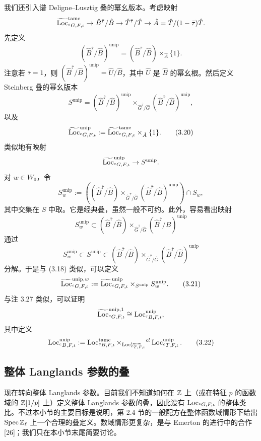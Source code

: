 我们还引入谱 Deligne–Lusztig 叠的幂幺版本。考虑映射
\[
\widetilde{\operatorname{Loc}}^{\mathrm{tame}}_{{}^{c}G,F,\iota}\to\hat B^{\bar\tau}/\hat B\to\hat T^{\bar\tau}/\hat T\to\hat A=\hat T/(1-\bar\tau)\hat T.
\]
先定义
\[
(\hat B^{\bar\tau}/\hat B)^{\mathrm{unip}}=(\hat B^{\bar\tau}/\hat B)\times_{\hat A}\{1\}.
\]
注意若 $\bar\tau=1$，则 $(\hat B^{\bar\tau}/\hat B)^{\mathrm{unip}}=\hat U/\hat B$，其中 $\hat U$ 是 $\hat B$ 的幂幺根。然后定义 Steinberg 叠的幂幺版本
\begin{equation}
S^{\mathrm{unip}}=(\hat B^{\bar\tau}/\hat B)^{\mathrm{unip}}\times_{\hat G^{\bar\tau}/\hat G}(\hat B^{\bar\tau}/\hat B)^{\mathrm{unip}}, \tag{3.19}
\end{equation}
以及
\begin{equation}
\widetilde{\operatorname{Loc}}^{\mathrm{unip}}_{{}^{c}G,F,\iota}:=\widetilde{\operatorname{Loc}}^{\mathrm{tame}}_{{}^{c}G,F,\iota}\times_{\hat A}\{1\}. \tag{3.20}
\end{equation}
类似地有映射
\[
\widetilde{\operatorname{Loc}}^{\mathrm{unip}}_{{}^{c}G,F,\iota}\to S^{\mathrm{unip}}.
\]
对 $w\in W_0$，令
\[
S^{\mathrm{unip}}_w:=((\hat B^{\bar\tau}/\hat B)\times_{\hat G^{\bar\tau}/\hat G}(\hat B^{\bar\tau}/\hat B)^{\mathrm{unip}})\cap S_w,
\]
其中交集在 $S$ 中取。它是经典叠，虽然一般不可约。此外，容易看出映射
\[
S^{\mathrm{unip}}_w\subset(\hat B^{\bar\tau}/\hat B)\times_{\hat G^{\bar\tau}/\hat G}(\hat B^{\bar\tau}/\hat B)^{\mathrm{unip}}
\]
通过
\[
S^{\mathrm{unip}}_w\subset S^{\mathrm{unip}}\subset(\hat B^{\bar\tau}/\hat B)\times_{\hat G^{\bar\tau}/\hat G}(\hat B^{\bar\tau}/\hat B)^{\mathrm{unip}}
\]
分解。于是与 (3.18) 类似，可以定义
\begin{equation}
\widetilde{\operatorname{Loc}}^{\mathrm{unip},w}_{{}^{c}G,F,\iota}:=\widetilde{\operatorname{Loc}}^{\mathrm{unip}}_{{}^{c}G,F,\iota}\times_{S^{\mathrm{unip}}}S^{\mathrm{unip}}_w. \tag{3.21}
\end{equation}
与注 3.27 类似，可以证明
\[
\widetilde{\operatorname{Loc}}^{\mathrm{unip},1}_{{}^{c}G,F,\iota}\cong\operatorname{Loc}^{\mathrm{unip}}_{{}^{c}B,F,\iota},
\]
其中定义
\begin{equation}
\operatorname{Loc}^{\mathrm{unip}}_{{}^{c}B,F,\iota}:=\operatorname{Loc}^{\mathrm{tame}}_{{}^{c}B,F,\iota}\times_{\operatorname{Loc}^{\mathrm{tame}}_{{}^{c}T,F,\iota}}{}^{cl}\operatorname{Loc}^{\mathrm{unip}}_{{}^{c}T,F,\iota}. \tag{3.22}
\end{equation}
\subsection{整体 Langlands 参数的叠}

现在转向整体 Langlands 参数。目前我们不知道如何在 $\mathbb{Z}$ 上（或在特征 $p$ 的函数域的 $\mathbb{Z}[1/p]$ 上）定义整体 Langlands 参数的叠，因此没有 $\operatorname{Loc}_{{}^{c}G,F,\iota}$ 的整体类比。不过本小节的主要目标是说明，第 2.4 节的一般配方在整体函数域情形下给出 $\operatorname{Spec}\mathbb{Z}_{\ell}$ 上一个合理的叠定义。数域情形更复杂，是与 Emerton 的进行中的合作 [26]；我们只在本小节末尾简要讨论。

